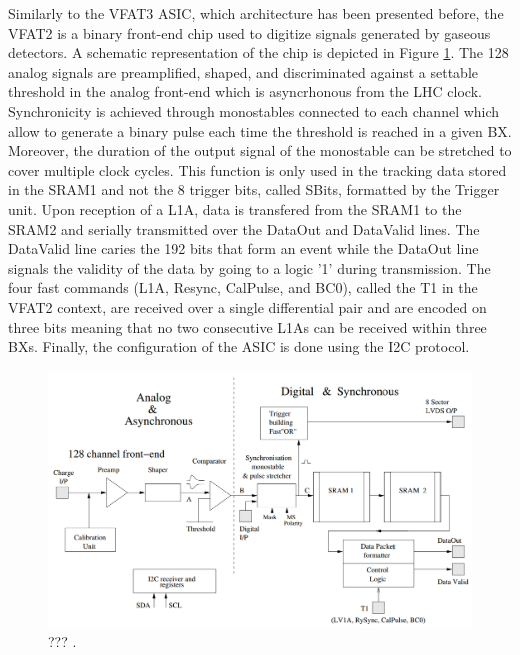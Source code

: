       Similarly to the VFAT3 ASIC, which architecture has been presented before, the VFAT2 is a binary front-end chip used to digitize signals generated by gaseous detectors. A schematic representation of the chip is depicted in Figure \ref{fig:II-2-vfat2}. The 128 analog signals are preamplified, shaped, and discriminated against a settable threshold in the analog front-end which is asyncrhonous from the LHC clock. Synchronicity is achieved through monostables connected to each channel which allow to generate a binary pulse each time the threshold is reached in a given BX. Moreover, the duration of the output signal of the monostable can be stretched to cover multiple clock cycles. This function is only used in the tracking data stored in the SRAM1 and not the 8 trigger bits, called SBits, formatted by the Trigger unit. Upon reception of a L1A, data is transfered from the SRAM1 to the SRAM2 and serially transmitted over the DataOut and DataValid lines. The DataValid line caries the 192 bits that form an event while the DataOut line signals the validity of the data by going to a logic '1' during transmission. The four fast commands (L1A, Resync, CalPulse, and BC0), called the T1 in the VFAT2 context, are received over a single differential pair and are encoded on three bits meaning that no two consecutive L1As can be received within three BXs. Finally, the configuration of the ASIC is done using the I2C protocol. \\

      \begin{figure}[h!]
        \centering
        \includegraphics[width=\textwidth]{img/II-2-daq/vfat2.png}
        \caption{??? \cite{Aspell:1069906}.}
        \label{fig:II-2-vfat2}
      \end{figure}

